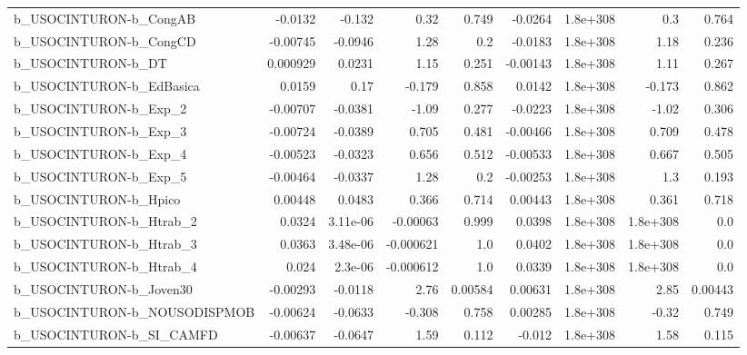 \begin{tabular}{lrrrrrrrr}
b\_USOCINTURON-b\_CongAB       &     -0.0132 &       -0.132 &      0.32 &    0.749 &    -0.0264 &    1.8e+308 &          0.3 &         0.764 \\
b\_USOCINTURON-b\_CongCD       &    -0.00745 &      -0.0946 &      1.28 &      0.2 &    -0.0183 &    1.8e+308 &         1.18 &         0.236 \\
b\_USOCINTURON-b\_DT           &    0.000929 &       0.0231 &      1.15 &    0.251 &   -0.00143 &    1.8e+308 &         1.11 &         0.267 \\
b\_USOCINTURON-b\_EdBasica     &      0.0159 &         0.17 &    -0.179 &    0.858 &     0.0142 &    1.8e+308 &       -0.173 &         0.862 \\
b\_USOCINTURON-b\_Exp\_2        &    -0.00707 &      -0.0381 &     -1.09 &    0.277 &    -0.0223 &    1.8e+308 &        -1.02 &         0.306 \\
b\_USOCINTURON-b\_Exp\_3        &    -0.00724 &      -0.0389 &     0.705 &    0.481 &   -0.00466 &    1.8e+308 &        0.709 &         0.478 \\
b\_USOCINTURON-b\_Exp\_4        &    -0.00523 &      -0.0323 &     0.656 &    0.512 &   -0.00533 &    1.8e+308 &        0.667 &         0.505 \\
b\_USOCINTURON-b\_Exp\_5        &    -0.00464 &      -0.0337 &      1.28 &      0.2 &   -0.00253 &    1.8e+308 &          1.3 &         0.193 \\
b\_USOCINTURON-b\_Hpico        &     0.00448 &       0.0483 &     0.366 &    0.714 &    0.00443 &    1.8e+308 &        0.361 &         0.718 \\
b\_USOCINTURON-b\_Htrab\_2      &      0.0324 &     3.11e-06 &  -0.00063 &    0.999 &     0.0398 &    1.8e+308 &     1.8e+308 &           0.0 \\
b\_USOCINTURON-b\_Htrab\_3      &      0.0363 &     3.48e-06 & -0.000621 &      1.0 &     0.0402 &    1.8e+308 &     1.8e+308 &           0.0 \\
b\_USOCINTURON-b\_Htrab\_4      &       0.024 &      2.3e-06 & -0.000612 &      1.0 &     0.0339 &    1.8e+308 &     1.8e+308 &           0.0 \\
b\_USOCINTURON-b\_Joven30      &    -0.00293 &      -0.0118 &      2.76 &  0.00584 &    0.00631 &    1.8e+308 &         2.85 &       0.00443 \\
b\_USOCINTURON-b\_NOUSODISPMOB &    -0.00624 &      -0.0633 &    -0.308 &    0.758 &    0.00285 &    1.8e+308 &        -0.32 &         0.749 \\
b\_USOCINTURON-b\_SI\_CAMFD     &    -0.00637 &      -0.0647 &      1.59 &    0.112 &     -0.012 &    1.8e+308 &         1.58 &         0.115 \\

\end{tabular}
